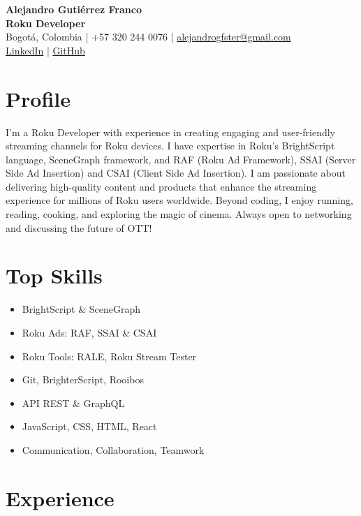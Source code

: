 \documentclass[11pt,a4paper]{article}
\begin{document}
\raggedright
\sloppy

\begin{center}
    {\LARGE \textbf{Alejandro Gutiérrez Franco}}\\
    \textbf{Roku Developer} \\
    Bogotá, Colombia | +57 320 244 0076 | \href{mailto:alejandrogfster@gmail.com}{alejandrogfster@gmail.com} \\
    \href{https://www.linkedin.com/in/alejandro-gutierrez-franco-06214674}{LinkedIn} |
    \href{https://github.com/fragualej/hello-roku}{GitHub}
\end{center}

\section*{Profile}
I'm a Roku Developer with experience in creating engaging and user-friendly streaming channels for Roku devices. I have expertise in Roku's BrightScript language, SceneGraph framework, and RAF (Roku Ad Framework), SSAI (Server Side Ad Insertion) and CSAI (Client Side Ad Insertion). I am passionate about delivering high-quality content and products that enhance the streaming experience for millions of Roku users worldwide. Beyond coding, I enjoy running, reading, cooking, and exploring the magic of cinema. Always open to networking and discussing the future of OTT!

\section*{Top Skills}
\begin{multicols}{2}
\begin{itemize}
    \item BrightScript \& SceneGraph
    \item Roku Ads: RAF, SSAI \& CSAI
    \item Roku Tools: RALE, Roku Stream Tester
    \item Git, BrighterScript, Rooibos
    \item API REST \& GraphQL
    \item JavaScript, CSS, HTML, React
    \item Communication, Collaboration, Teamwork
\end{itemize}
\end{multicols}

\section*{Experience}
\end{document}
